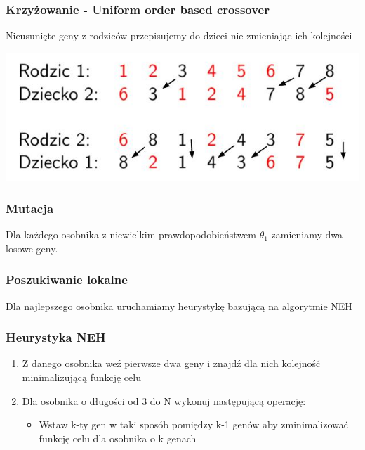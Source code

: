 \documentclass{beamer}
\begin{document}
\begin{frame}
 \frametitle{Krzyżowanie - Uniform order based crossover}
 Nieusunięte geny z rodziców przepisujemy do dzieci nie zmieniając ich kolejności
 
 \begin{center}
 \includegraphics[scale=0.5]{./Grafika/crossover.jpg}
\end{center}

 

\end{frame}


\begin{frame}
 \frametitle{Mutacja}

 Dla każdego osobnika z niewielkim prawdopodobieństwem $ \theta_1 $ zamieniamy dwa losowe geny.

\end{frame}

\begin{frame}
 \frametitle{Poszukiwanie lokalne}
 
 Dla najlepszego osobnika uruchamiamy heurystykę bazującą na algorytmie NEH


\end{frame}


\begin{frame}
 \frametitle{ Heurystyka NEH}
 \begin{enumerate}
  \item Z danego osobnika weź pierwsze dwa geny i znajdź dla nich kolejność minimalizującą funkcję celu
  \item Dla osobnika o długości od 3 do N wykonuj następującą operację:
  \begin{itemize}
   \item Wstaw k-ty gen w taki sposób pomiędzy k-1 genów aby zminimalizować funkcję celu dla osobnika o k genach
  \end{itemize}
 \end{enumerate}
 \end{frame}
 
\end{document}
